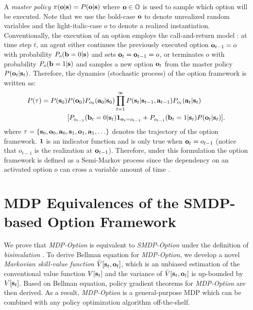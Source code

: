 \documentclass{article}
\begin{document}
A \emph{master policy} $\pi({\mathbf{o}}|{\mathbf{s}})=P({\mathbf{o}}|{\mathbf{s}})$ where
${\mathbf{o}}\in{\mathbb{O}}$ is used to sample which option will be executed.
Note that we use the bold-case ${\mathbf{o}}$ to denote unrealized random
variables and the light-italic-case $o$ to denote a realized
instantiation. Conventionally, the execution of an option employs
the call-and-return model \cite{sutton1999between}: at time step
$t$, an agent either continues the previously executed option
${\mathbf{o}}_{t-1}=o$ with probability $P_o({\mathbf{b}}=0|{\mathbf{s}})$ and sets
${\mathbf{o}}_t={\mathbf{o}}_{t-1}=o$, or terminates $o$ with probability
$P_o({\mathbf{b}}=1|{\mathbf{s}})$ and samples a new option ${\mathbf{o}}_t$ from the
master policy $P({\mathbf{o}}_t|{\mathbf{s}}_t)$. Therefore, the dynamics
(stochastic process) of the option framework is written as:
\begin{align}
  \label{eq:oc_pgm_joint}
  P(\tau) = P({\mathbf{s}}_0)&P({\mathbf{o}}_0)P_{o_0}({\mathbf{a}}_0|{\mathbf{s}}_0)\prod_{t=1}^\infty P({\mathbf{s}}_t|{\mathbf{s}}_{t-1},{\mathbf{a}}_{t-1})P_{o_t}({\mathbf{a}}_{t}|{\mathbf{s}}_{t})\nonumber\\
                     &[P_{o_{t-1}}({\mathbf{b}}_t=0|{\mathbf{s}}_t)\bm{1}_{{\mathbf{o}}_t=o_{t-1}} +P_{o_{t-1}}({\mathbf{b}}_t=1|{\mathbf{s}}_t)P({\mathbf{o}}_t|{\mathbf{s}}_t)].
\end{align}
where $\tau=\{{\mathbf{s}}_0,{\mathbf{o}}_0,{\mathbf{a}}_0,{\mathbf{s}}_1,{\mathbf{o}}_1,{\mathbf{a}}_1,\ldots\}$
denotes the trajectory of the option framework. $\bm{1}$ is an
indicator function and is only true when ${\mathbf{o}}_t=o_{t-1}$ (notice
that $o_{t-1}$ is the realization at ${\mathbf{o}}_{t-1}$). Therefore,
under this formulation the option framework is defined as a
Semi-Markov process since the dependency on an activated option
$o$ can cross a variable amount of time \cite{sutton1999between}.

\section{MDP Equivalences of the SMDP-based Option Framework}
\label{sec:smdp_mdp_sa}
We prove that \emph{MDP-Option} is equivalent to
\emph{SMDP-Option} under the definition of \emph{bisimulation}
\cite{givan2003equivalence}. To derive Bellman equation for
\emph{MDP-Option}, we develop a novel \emph{Markovian skill-value
  function} $\bar{V}[{\mathbf{s}}_t,{\mathbf{o}}_t]$, which is an unbiased
estimation of the conventional value function $V[{\mathbf{s}}_t]$ and the
variance of $\bar{V}[{\mathbf{s}}_t,{\mathbf{o}}_t]$ is up-bounded by
$V[{\mathbf{s}}_t]$. Based on Bellman equation, policy gradient theorems
for \emph{MDP-Option} are then derived. As a result,
\emph{MDP-Option} is a general-purpose MDP which can be combined
with any policy optimization algorithm off-the-shelf.
\end{document}
